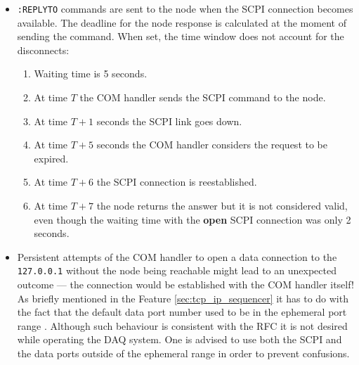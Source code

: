 \begin{itemize}
	\item{
		\texttt{:REPLYTO} commands are sent to the node when the SCPI connection becomes available. The deadline for the node response is calculated at the moment of sending the command. When set, the time window does not account for the disconnects:
		\begin{enumerate}
			\item Waiting time is 5 seconds.
			\item At time $T$ the COM handler sends the SCPI command to the node.
			\item At time $T + 1$ seconds the SCPI link goes down.
			\item At time $T + 5$ seconds the COM handler considers the request to be expired.
			\item At time $T + 6$ the SCPI connection is reestablished.
			\item At time $T + 7$ the node returns the answer but it is not considered valid, even though the waiting time with the \textbf{open} SCPI connection was only 2 seconds.
		\end{enumerate}
	}
	\item Persistent attempts of the COM handler to open a data connection to the \texttt{127.0.0.1} without the node being reachable might lead to an unexpected outcome --- the connection would be established with the COM handler itself! As briefly mentioned in the Feature \ref{sec:tcp_ip_sequencer} it has to do with the fact that the default data port number used to be in the ephemeral port range \cite{RichardStevens1998}. Although such behaviour is consistent with the RFC \cite{Postel1981} it is not desired while operating the DAQ system. One is advised to use both the SCPI and the data ports outside of the ephemeral range in order to prevent confusions.
\end{itemize}
